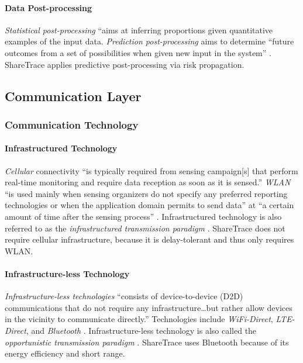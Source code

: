 \paragraph{Data Post-processing}

\emph{Statistical post-processing} ``aims at inferring proportions given quantitative examples of the input data. \emph{Prediction post-processing} aims to determine ``future outcomes from a set of possibilities when given new input in the system'' \cite{Capponi2019}. ShareTrace applies predictive post-processing via risk propagation.

\subsection{Communication Layer}

\subsubsection{Communication Technology}

\paragraph{Infrastructured Technology}

\emph{Cellular} connectivity ``is typically required from sensing campaign[s] that perform real-time monitoring and require data reception as soon as it is sensed.'' \emph{WLAN} ``is used mainly when sensing organizers do not specify any preferred reporting technologies or when the application domain permits to send data'' at ``a certain amount of time after the sensing process'' \cite{Capponi2019}. Infrastructured technology is also referred to as the \emph{infrastructured transmission paradigm} \cite{Ma2014}. ShareTrace does not require cellular infrastructure, because it is delay-tolerant and thus only requires WLAN.

\paragraph{Infrastructure-less Technology}

\emph{Infrastructure-less technologies} ``consists of device-to-device (D2D) communications that do not require any infrastructure{\ldots}but rather allow devices in the vicinity to communicate directly.'' Technologies include \emph{WiFi-Direct}, \emph{LTE-Direct}, and \emph{Bluetooth} \citep{Capponi2019}. Infrastructure-less technology is also called the \emph{opportunistic transmission paradigm} \citep{Ma2014}. ShareTrace uses Bluetooth because of its energy efficiency and short range.

